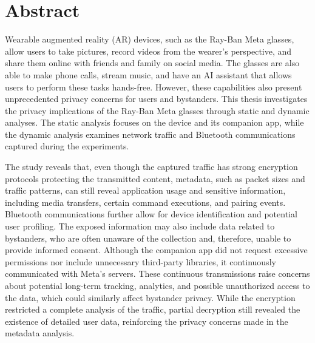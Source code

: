 \chapter{Abstract}

Wearable augmented reality (AR) devices, such as the Ray-Ban Meta glasses, allow users to take pictures, record videos from the wearer's perspective, and share them online with friends and family on social media. The glasses are also able to make phone calls, stream music, and have an AI assistant that allows users to perform these tasks hands-free. However, these capabilities also present unprecedented privacy concerns for users and bystanders. This thesis investigates the privacy implications of the Ray-Ban Meta glasses through static and dynamic analyses. The static analysis focuses on the device and its companion app, while the dynamic analysis examines network traffic and Bluetooth communications captured during the experiments.

The study reveals that, even though the captured traffic has strong encryption protocols protecting the transmitted content, metadata, such as packet sizes and traffic patterns, can still reveal application usage and sensitive information, including media transfers, certain command executions, and pairing events. Bluetooth communications further allow for device identification and potential user profiling. The exposed information may also include data related to bystanders, who are often unaware of the collection and, therefore, unable to provide informed consent. Although the companion app did not request excessive permissions nor include unnecessary third-party libraries, it continuously communicated with Meta's servers. These continuous transmissions raise concerns about potential long-term tracking, analytics, and possible unauthorized access to the data, which could similarly affect bystander privacy. While the encryption restricted a complete analysis of the traffic, partial decryption still revealed the existence of detailed user data, reinforcing the privacy concerns made in the metadata analysis.


